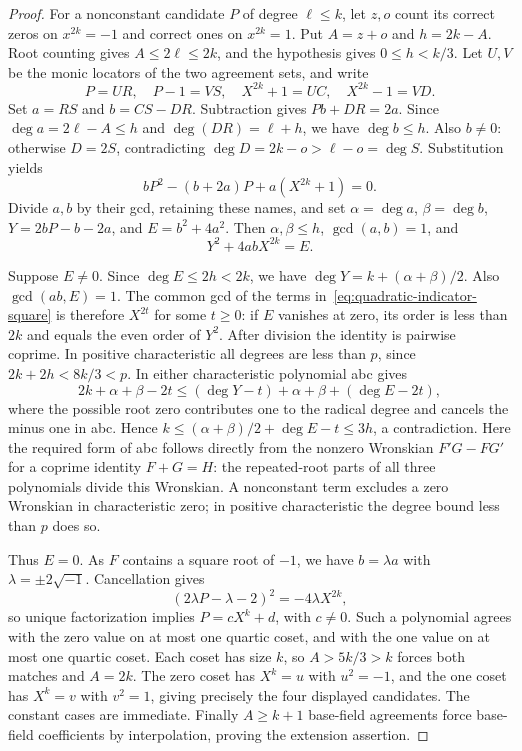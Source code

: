 \begin{proof}
For a nonconstant candidate $P$ of degree $\ell\le k$, let $z,o$ count
its correct zeros on $x^{2k}=-1$ and correct ones on $x^{2k}=1$. Put
$A=z+o$ and $h=2k-A$. Root counting gives $A\le2\ell\le2k$, and the
hypothesis gives $0\le h<k/3$. Let $U,V$ be the monic locators of the
two agreement sets, and write
\[
 P=UR,\quad P-1=VS,\quad X^{2k}+1=UC,\quad X^{2k}-1=VD.
\]
Set $a=RS$ and $b=CS-DR$. Subtraction gives $Pb+DR=2a$.
Since $\deg a=2\ell-A\le h$ and $\deg(DR)=\ell+h$, we have
$\deg b\le h$. Also $b\ne0$: otherwise $D=2S$, contradicting
$\deg D=2k-o>\ell-o=\deg S$. Substitution yields
\[
 bP^2-(b+2a)P+a(X^{2k}+1)=0.
\]
Divide $a,b$ by their gcd, retaining these names, and set
$\alpha=\deg a$, $\beta=\deg b$, $Y=2bP-b-2a$, and $E=b^2+4a^2$.
Then $\alpha,\beta\le h$, $\gcd(a,b)=1$, and
\begin{equation}\label{eq:quadratic-indicator-square}
 Y^2+4abX^{2k}=E.
\end{equation}

Suppose $E\ne0$. Since $\deg E\le2h<2k$, we have
$\deg Y=k+(\alpha+\beta)/2$. Also $\gcd(ab,E)=1$.
The common gcd of the terms in~\eqref{eq:quadratic-indicator-square}
is therefore $X^{2t}$ for some $t\ge0$: if $E$ vanishes at zero,
its order is less than $2k$ and equals the even order of $Y^2$.
After division the identity is pairwise coprime. In positive characteristic all degrees are less
than $p$, since $2k+2h<8k/3<p$. In either characteristic polynomial abc gives
\[
 2k+\alpha+\beta-2t
 \le (\deg Y-t)+\alpha+\beta+(\deg E-2t),
\]
where the possible root zero contributes one to the radical degree
and cancels the minus one in abc. Hence
$k\le(\alpha+\beta)/2+\deg E-t\le3h$, a contradiction.
Here the required form of abc follows directly from the nonzero
Wronskian $F'G-FG'$ for a coprime identity $F+G=H$: the repeated-root
parts of all three polynomials divide this Wronskian. A nonconstant term excludes a zero Wronskian in characteristic zero;
in positive characteristic the degree bound less than $p$ does so.

Thus $E=0$. As $F$ contains a square root of $-1$, we have
$b=\lambda a$ with $\lambda=\pm2\sqrt{-1}$. Cancellation gives
\[
 (2\lambda P-\lambda-2)^2=-4\lambda X^{2k},
\]
so unique factorization implies $P=cX^k+d$, with $c\ne0$.
Such a polynomial agrees with the zero value on at most one quartic
coset, and with the one value on at most one quartic coset. Each coset
has size $k$, so $A>5k/3>k$ forces both matches and $A=2k$.
The zero coset has $X^k=u$ with $u^2=-1$, and the one coset has
$X^k=v$ with $v^2=1$, giving precisely the four displayed candidates.
The constant cases are immediate. Finally $A\ge k+1$ base-field
agreements force base-field coefficients by interpolation, proving
the extension assertion.
\end{proof}

